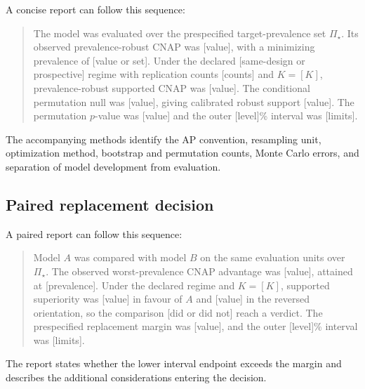 \documentclass[11pt]{article}
\newcommand{\PSet}{\Pi_\star}
\theoremstyle{remark}
\begin{document}
A concise report can follow this sequence:
\begin{quote}
The model was evaluated over the prespecified target-prevalence set $\PSet$. Its observed prevalence-robust CNAP was [value], with a minimizing prevalence of [value or set]. Under the declared [same-design or prospective] regime with replication counts [counts] and $K=[K]$, prevalence-robust supported CNAP was [value]. The conditional permutation null was [value], giving calibrated robust support [value]. The permutation $p$-value was [value] and the outer [level]\% interval was [limits].
\end{quote}
The accompanying methods identify the AP convention, resampling unit, optimization method, bootstrap and permutation counts, Monte Carlo errors, and separation of model development from evaluation.

\subsection{Paired replacement decision}

A paired report can follow this sequence:
\begin{quote}
Model $A$ was compared with model $B$ on the same evaluation units over $\PSet$. The observed worst-prevalence CNAP advantage was [value], attained at [prevalence]. Under the declared regime and $K=[K]$, supported superiority was [value] in favour of $A$ and [value] in the reversed orientation, so the comparison [did or did not] reach a verdict. The prespecified replacement margin was [value], and the outer [level]\% interval was [limits].
\end{quote}
The report states whether the lower interval endpoint exceeds the margin and describes the additional considerations entering the decision.
\end{document}

